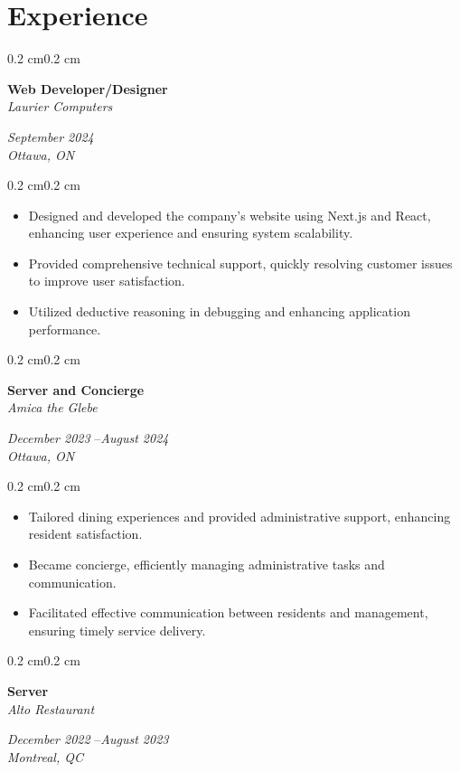 \documentclass[10pt, letterpaper]{article}
\newenvironment{highlights}{%
    \begin{itemize}[
        topsep=0.10 cm,%
        parsep=0.10 cm,%
        partopsep=0pt,%
        itemsep=0pt,%
        leftmargin=0.4 cm + 10pt%
    ]
}{%
    \end{itemize}%
}
\newenvironment{onecolentry}{%
    \begin{adjustwidth}{0.2 cm}{0.2 cm}%
}{%
    \end{adjustwidth}%
}
\newenvironment{twocolentry}[1]{%
    \begin{onecolentry}%
    \def\twocolentryarg{#1}%
    \noindent
    \begin{minipage}[t]{0.68\textwidth} %
}{%
    \end{minipage}\hfill%
    \begin{minipage}[t]{0.30\textwidth} %
      \raggedleft\twocolentryarg
    \end{minipage}%
    \vspace{0.2cm}%
    \end{onecolentry}%
}
\begin{document}
\section{Experience}
\begin{twocolentry}{%
\textit{September 2024 }\textit{} \\[0.1cm]
\textit{Ottawa, ON}%
}
    \textbf{Web Developer/Designer }\\
    \textit{Laurier Computers }
\end{twocolentry}
\vspace{0.10 cm}
\begin{onecolentry}
    \begin{highlights}
        \item Designed and developed the company’s website using Next.js and React, enhancing user experience and ensuring system scalability.
        \item Provided comprehensive technical support, quickly resolving customer issues to improve user satisfaction.
        \item Utilized deductive reasoning in debugging and enhancing application performance.
    \end{highlights}
\end{onecolentry}
\vspace{0.2 cm}
\begin{twocolentry}{%
\textit{December 2023 }--\textit{August 2024} \\[0.1cm]
\textit{Ottawa, ON}%
}
    \textbf{Server and Concierge }\\
    \textit{Amica the Glebe }
\end{twocolentry}
\vspace{0.10 cm}
\begin{onecolentry}
    \begin{highlights}
        \item Tailored dining experiences and provided administrative support, enhancing resident satisfaction.
        \item Became concierge, efficiently managing administrative tasks and communication.
        \item Facilitated effective communication between residents and management, ensuring timely service delivery.
    \end{highlights}
\end{onecolentry}
\vspace{0.2 cm}
\begin{twocolentry}{%
\textit{December 2022 }--\textit{August 2023} \\[0.1cm]
\textit{Montreal, QC}%
}
    \textbf{Server }\\
    \textit{Alto Restaurant }
\end{twocolentry}
\end{document}
